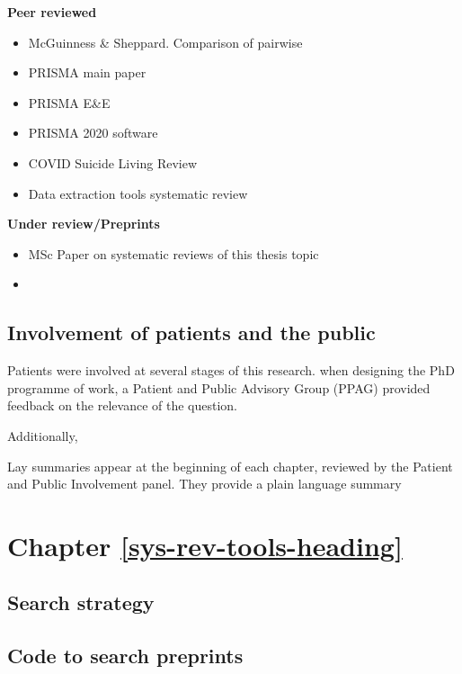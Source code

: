 \documentclass[a4paper, twoside]{templates/ociamthesis}
\begin{document}
\textbf{Peer reviewed}

\begin{itemize}
\item
  McGuinness \& Sheppard. Comparison of pairwise
\item
  PRISMA main paper
\item
  PRISMA E\&E
\item
  PRISMA 2020 software
\item
  COVID Suicide Living Review
\item
  Data extraction tools systematic review
\end{itemize}

\textbf{Under review/Preprints}

\begin{itemize}
\item
  MSc Paper on systematic reviews of this thesis topic
\item
\end{itemize}

\hypertarget{appendix-ppi}{%
\subsection{Involvement of patients and the public}\label{appendix-ppi}}

Patients were involved at several stages of this research. when designing the PhD programme of work, a Patient and Public Advisory Group (PPAG) provided feedback on the relevance of the question.

Additionally,

Lay summaries appear at the beginning of each chapter, reviewed by the Patient and Public Involvement panel. They provide a plain language summary

\hypertarget{appendix-sys-rev-tools}{%
\section{Chapter \ref{sys-rev-tools-heading}}\label{appendix-sys-rev-tools}}

\hypertarget{appendix-search-strategy}{%
\subsection{Search strategy}\label{appendix-search-strategy}}

\hypertarget{appendix-medrxivr-code}{%
\subsection{Code to search preprints}\label{appendix-medrxivr-code}}
\end{document}
